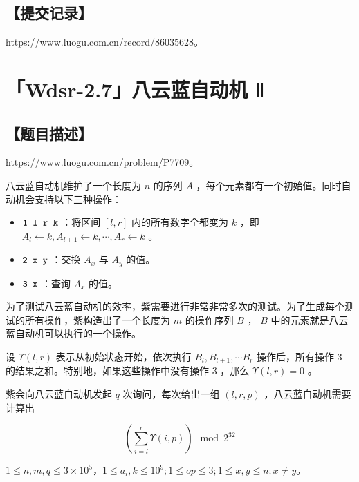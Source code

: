 \documentclass[UTF8,12pt,a4paper]{ctexart}
\begin{document}
	\subsection*{【提交记录】}
	
	https://www.luogu.com.cn/record/86035628。
	
	
	\section*{「Wdsr-2.7」八云蓝自动机 $Ⅱ$}
	
	\subsection*{【题目描述】}
	
	https://www.luogu.com.cn/problem/P7709。
	
	八云蓝自动机维护了一个长度为 $n$ 的序列 $A$ ，每个元素都有一个初始值。同时自动机会支持以下三种操作：
	
	\begin{itemize}
		\item ${\verb!1 l r k!}$ ：将区间 $[l,r]$ 内的所有数字全都变为 $k$ ，即 $A_l\gets k,A_{l+1}\gets k,\cdots ,A_r\gets k$ 。
		\item ${\verb!2 x y!}$ ：交换 $A_x$ 与 $A_y$ 的值。
		\item ${\verb!3 x!}$ ：查询 $A_x$ 的值。
	\end{itemize}
	
	为了测试八云蓝自动机的效率，紫需要进行非常非常多次的测试。为了生成每个测试的所有操作，紫构造出了一个长度为 $m$ 的操作序列 $B$ ， $B$ 中的元素就是八云蓝自动机可以执行的一个操作。
	
	设 $\Upsilon(l,r)$ 表示从初始状态开始，依次执行 $B_l,B_{l+1},\cdots B_r$ 操作后，所有操作 $3$ 的结果之和。特别地，如果这些操作中没有操作 $3$ ，那么 $\Upsilon(l,r)=0$ 。
	
	紫会向八云蓝自动机发起 $q$ 次询问，每次给出一组 $(l,r,p)$ ，八云蓝自动机需要计算出 
	
	$$\left(\sum_{i=l}^r \Upsilon(i,p)\right) \mod 2^{32}$$
	
	$1 \le n,m,q \le 3 \times 10 ^ 5$，$1 \le a_i,k \le 10^9;1 \le op \le 3;1 \le x,y \le n;x \neq y$。
	
\end{document}
